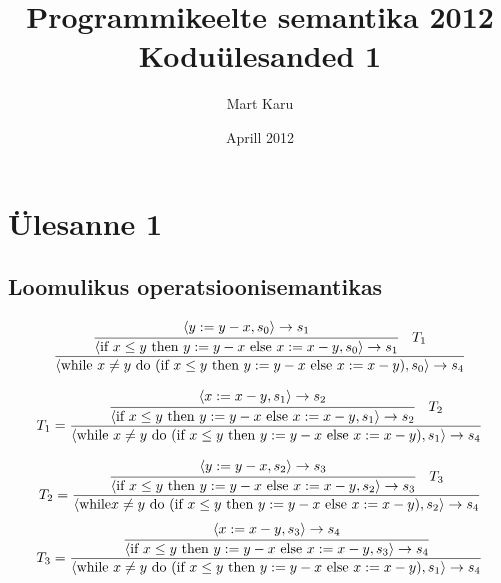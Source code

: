 \documentclass[a4paper,oneside,draft]{article}
\begin{document}
\title{Programmikeelte semantika 2012\\
Koduülesanded 1}
\author{Mart Karu}
\date{Aprill 2012}
\maketitle
\section{Ülesanne 1}
\subsection{Loomulikus operatsioonisemantikas}

\[
  \frac{
    \cfrac{
      \langle y := y-x, s_0 \rangle \rightarrow s_1
    }{
      \langle
        \text{if } x \leq y
          \text{ then } y := y-x
          \text{ else } x := x-y
        , s_0
      \rangle \rightarrow s_1
    }
    \quad
    T_1
  }{
    \langle 
    \text{while } x \neq  y \text{ do }
      (\text{if } x \leq y
        \text{ then } y := y-x
        \text{ else } x := x-y)
      , s_0
    \rangle \rightarrow s_4
  }
\]

\[
  T_1 = \frac{
    \cfrac{
      \langle x := x-y, s_1 \rangle \rightarrow s_2
    }{
      \langle 
        \text{if } x \leq y
          \text{ then } y := y-x
          \text{ else } x:= x-y
        , s_1
      \rangle \rightarrow s_2
    }
    \quad
    T_2
  }{
    \langle 
    \text{while } x \neq y \text{ do }
      (\text{if } x \leq y
        \text{ then } y := y-x
        \text{ else } x:= x-y)
      , s_1
    \rangle \rightarrow s_4
  }
\]

\[
  T_2 = \frac{
    \cfrac{
      \langle y := y-x, s_2 \rangle \rightarrow s_3
    }{
      \langle 
        \text{if } x \leq y
          \text{ then } y := y-x
          \text{ else } x := x-y
        , s_2
      \rangle \rightarrow s_3
    }
    \quad
    T_3
  }{
    \langle 
    \text{while} x \neq  y \text{ do }
      (\text{if } x \leq y
        \text{ then } y := y-x
        \text{ else } x := x-y)
      , s_2
    \rangle \rightarrow s_4
  }
\]
\[
  T_3 = \frac{
    \cfrac{
      \langle x := x-y, s_3 \rangle \rightarrow s_4
    }{
      \langle
        \text{if } x \leq y
          \text{ then } y := y-x
          \text{ else } x := x-y
        , s_3
      \rangle \rightarrow s_4
    }
  }{
    \langle
    \text{while } x \neq y \text{ do }
      (\text{if } x \leq y
        \text{ then } y := y-x
        \text{ else } x := x-y )
      , s_1
    \rangle \rightarrow s_4
  }
\]
\end{document}
